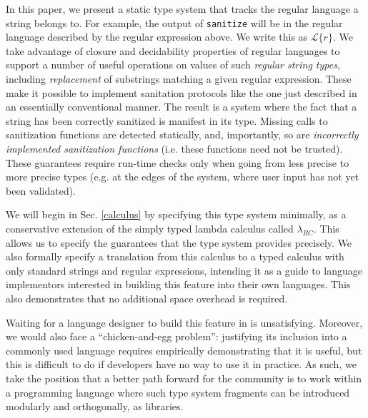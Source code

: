 \documentclass[9pt]{sig-alternate}
\theoremstyle{definition}
\begin{document}
In this paper, we present a static type system that tracks the regular language a string belongs to. For example, the output of \verb|sanitize| will be in the regular language described by the regular expression above. We write this as $\mathcal{L}\{r\}$. We take advantage of closure and decidability properties of regular languages to support a number of useful operations on values of such \emph{regular string types}, including \emph{replacement} of substrings matching a given regular expression. These make it possible to implement sanitation protocols like the one just described in an essentially conventional manner. The result is a system where the fact that a string has been {correctly} sanitized is manifest in its type. Missing calls to sanitization functions are detected statically, and, importantly, so are \emph{incorrectly implemented sanitization functions} (i.e. these functions need not be trusted). These guarantees require run-time checks only when going from less precise to more precise types (e.g. at the edges of the system, where user input has not yet been validated). %

We will begin in Sec. \ref{calculus} by specifying this type system minimally, as a conservative extension of the simply typed lambda calculus called $\lambda_{RC}$. This allows us to specify the guarantees that the type system provides precisely. We also formally specify a translation from this calculus to a typed calculus with only standard strings and regular expressions, intending it as a guide to language implementors interested in building this feature into their own languages. This also demonstrates that no additional space overhead is required.

Waiting for a language designer to build this feature in is unsatisfying. Moreover, we would also face a ``chicken-and-egg problem'': justifying its inclusion into a commonly used language requires empirically demonstrating that it is useful, but this is difficult to do if developers have no way to use it in practice. As such, we take the position that a better path forward for the community is to work within a programming language where such type system fragments can be introduced modularly and orthogonally, as libraries. 
\end{document}
